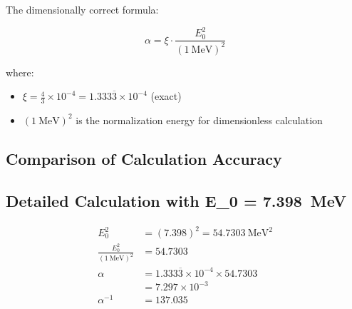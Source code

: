 	The dimensionally correct formula:
	
	\begin{equation}
		\alpha = \xi \cdot \frac{E_0^2}{( \SI{1}{\MeV} )^2}
	\end{equation}
	
	where:
	\begin{itemize}
		\item $\xi = \frac{4}{3} \times 10^{-4} = 1.333\overline{3} \times 10^{-4}$ (exact)
		\item $( \SI{1}{\MeV} )^2$ is the normalization energy for dimensionless calculation
	\end{itemize}
	
	\subsection{Comparison of Calculation Accuracy}
	
	\begin{table}[h]
		\centering
		\caption{Comparison of calculation accuracy for different E\_0 values}
	\end{table}
	
	\subsection{Detailed Calculation with E\_0 = \SI{7.398}{\MeV}}
	
	\begin{align}
		E_0^2 &= (7.398)^2 = \SI{54.7303}{\MeV\squared} \\
		\frac{E_0^2}{( \SI{1}{\MeV} )^2} &= 54.7303 \\
		\alpha &= 1.333\overline{3} \times 10^{-4} \times 54.7303 \\
		&= 7.297 \times 10^{-3} \\
		\alpha^{-1} &= 137.035
	\end{align}
	
